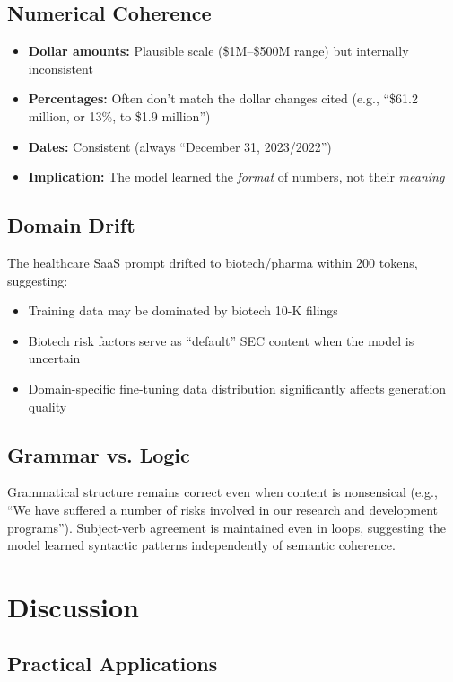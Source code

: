 \documentclass[12pt]{article}
\begin{document}
\subsection{Numerical Coherence}

\begin{itemize}
    \item \textbf{Dollar amounts:} Plausible scale (\$1M--\$500M range) but internally inconsistent
    \item \textbf{Percentages:} Often don't match the dollar changes cited (e.g., ``\$61.2 million, or 13\%, to \$1.9 million'')
    \item \textbf{Dates:} Consistent (always ``December 31, 2023/2022'')
    \item \textbf{Implication:} The model learned the \textit{format} of numbers, not their \textit{meaning}
\end{itemize}

\subsection{Domain Drift}

The healthcare SaaS prompt drifted to biotech/pharma within 200 tokens, suggesting:
\begin{itemize}
    \item Training data may be dominated by biotech 10-K filings
    \item Biotech risk factors serve as ``default'' SEC content when the model is uncertain
    \item Domain-specific fine-tuning data distribution significantly affects generation quality
\end{itemize}

\subsection{Grammar vs. Logic}

Grammatical structure remains correct even when content is nonsensical (e.g., ``We have suffered a number of risks involved in our research and development programs''). Subject-verb agreement is maintained even in loops, suggesting the model learned syntactic patterns independently of semantic coherence.

\section{Discussion}

\subsection{Practical Applications}
\end{document}
